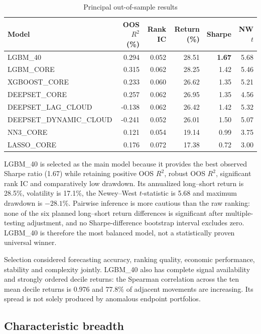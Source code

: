 \documentclass[11pt,a4paper]{article}
\begin{document}
\begin{table}[ht]
\centering\small
\caption{Principal out-of-sample results}
\label{tab:main}
\begin{tabular}{lrrrrr}
\toprule
Model & OOS $R^2$ (\%) & Rank IC & Return (\%) & Sharpe & NW $t$ \\
\midrule
LGBM\_40 & 0.294 & 0.052 & 28.51 & \textbf{1.67} & 5.68 \\
LGBM\_CORE & 0.315 & 0.062 & 28.25 & 1.42 & 5.46 \\
XGBOOST\_CORE & 0.233 & 0.060 & 26.62 & 1.35 & 5.21 \\
DEEPSET\_CORE & 0.257 & 0.062 & 26.95 & 1.35 & 4.56 \\
DEEPSET\_LAG\_CLOUD & -0.138 & 0.062 & 26.42 & 1.42 & 5.32 \\
DEEPSET\_DYNAMIC\_CLOUD & -0.241 & 0.052 & 26.01 & 1.50 & 5.07 \\
NN3\_CORE & 0.121 & 0.054 & 19.14 & 0.99 & 3.75 \\
LASSO\_CORE & 0.176 & 0.072 & 17.38 & 0.72 & 3.00 \\
\bottomrule
\end{tabular}
\end{table}

LGBM\_40 is selected as the main model because it provides the best observed Sharpe ratio (1.67) while retaining positive OOS $R^2$, robust OOS $R^2$, significant rank IC and comparatively low drawdown. Its annualized long--short return is 28.5\%, volatility is 17.1\%, the Newey--West $t$-statistic is 5.68 and maximum drawdown is $-28.1$\%. Pairwise inference is more cautious than the raw ranking: none of the six planned long--short return differences is significant after multiple-testing adjustment, and no Sharpe-difference bootstrap interval excludes zero. LGBM\_40 is therefore the most balanced model, not a statistically proven universal winner.

Selection considered forecasting accuracy, ranking quality, economic performance, stability and complexity jointly. LGBM\_40 also has complete signal availability and strongly ordered decile returns: the Spearman correlation across the ten mean decile returns is 0.976 and 77.8\% of adjacent movements are increasing. Its spread is not solely produced by anomalous endpoint portfolios.

\subsection*{Characteristic breadth}
\end{document}
